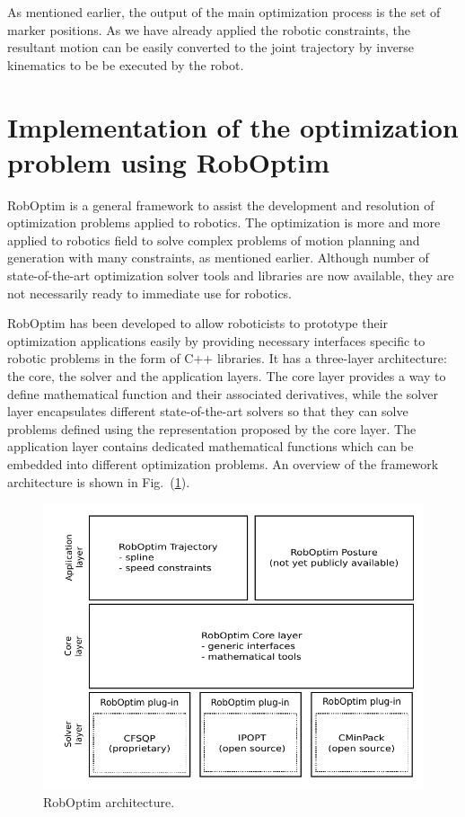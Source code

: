 \documentclass[letterpaper, 10 pt, conference]{ieeeconf}  %
\begin{document}
As mentioned earlier, the output of the main optimization process is
the set of marker positions. As we have already applied the robotic
constraints, the resultant motion can be easily converted to the 
joint trajectory by inverse kinematics to be be executed by 
the robot. 

\section{Implementation of the optimization problem using RobOptim}
\label{sec:implementation}

RobOptim is a general framework to assist the development and resolution of
optimization problems applied to robotics. 
The optimization is more and more applied to robotics field to solve
complex problems of motion planning and generation with many
constraints, as mentioned earlier.
Although number of state-of-the-art optimization solver tools and
libraries are now available, they are not necessarily ready to
immediate use for robotics.

RobOptim has been developed to allow roboticists to prototype their
optimization applications easily by providing necessary interfaces
specific to robotic problems in the form of C++ libraries.
It has a three-layer
architecture: the core, the solver and the application layers.
The core layer provides a way to define mathematical
function and their associated derivatives, while the solver layer encapsulates
different state-of-the-art solvers so that they can solve problems
defined using the representation proposed by the core layer. 
The application layer contains dedicated mathematical functions which
can be embedded into different optimization problems. An overview of
the framework architecture is shown in Fig.~(\ref{fig:roboptim}).

\begin{figure}[b]
  \includegraphics[width=\linewidth]{figure/roboptim-architecture.pdf}
  \caption{RobOptim  architecture.}
  \label{fig:roboptim}
\end{figure}
\end{document}
